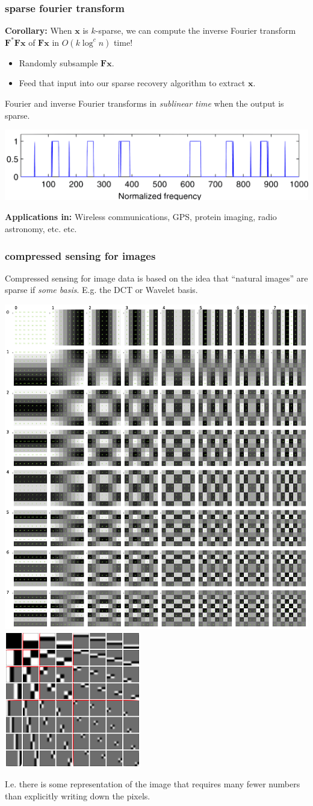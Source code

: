 \documentclass[compress]{beamer}
\newcommand{\bv}[1]{\mathbf{#1}}
\begin{document}
	\begin{frame}
		\frametitle{sparse fourier transform}
		\textbf{Corollary:} When $\bv{x}$ is $k$-sparse, we can compute the inverse Fourier transform $\bv{F}^*\bv{F}\bv{x}$ of $\bv{F}\bv{x}$ in $O(k\log^c n)$ time!
		\begin{itemize}
			\item Randomly subsample $\bv{F}\bv{x}$.
			\item Feed that input into our sparse recovery algorithm to extract $\bv{x}$. 
		\end{itemize}
		\begin{center}
			\alert{Fourier and inverse Fourier transforms in \emph{sublinear time} when the output is sparse. }
			
			\includegraphics[width=.8\textwidth]{multiband.png}
		\end{center}
		\textbf{Applications in:} Wireless communications, GPS, protein imaging, radio astronomy, etc. etc. 
	\end{frame}

\begin{frame}
	\frametitle{compressed sensing for images}
	Compressed sensing for image data is based on the idea that ``natural images'' are sparse if \emph{some basis}. E.g. the DCT or Wavelet basis.
	
		\begin{center}
		\includegraphics[width=.33\textwidth]{dct.png}		\includegraphics[width=.35\textwidth]{wavelet.png}
		\end{center}
	
	I.e. there is some representation of the image that requires many fewer numbers than explicitly writing down the pixels. 
\end{frame}
\end{document}
